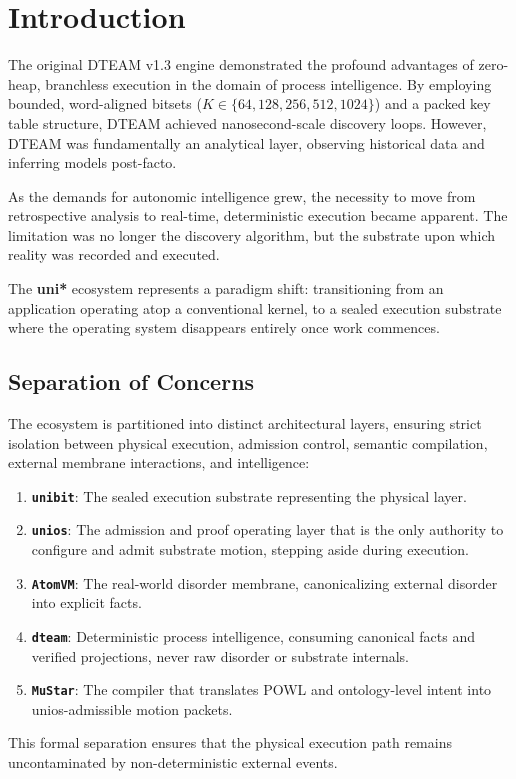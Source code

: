 \chapter{Introduction}

The original DTEAM v1.3 engine demonstrated the profound advantages of zero-heap, branchless execution in the domain of process intelligence. By employing bounded, word-aligned bitsets ($K \in \{64, 128, 256, 512, 1024\}$) and a packed key table structure, DTEAM achieved nanosecond-scale discovery loops. However, DTEAM was fundamentally an analytical layer, observing historical data and inferring models post-facto.

As the demands for autonomic intelligence grew, the necessity to move from retrospective analysis to real-time, deterministic execution became apparent. The limitation was no longer the discovery algorithm, but the substrate upon which reality was recorded and executed. 

The \textbf{uni*} ecosystem represents a paradigm shift: transitioning from an application operating atop a conventional kernel, to a sealed execution substrate where the operating system disappears entirely once work commences.

\section{Separation of Concerns}

The ecosystem is partitioned into distinct architectural layers, ensuring strict isolation between physical execution, admission control, semantic compilation, external membrane interactions, and intelligence:

\begin{enumerate}
    \item \textbf{\texttt{unibit}}: The sealed execution substrate representing the physical layer.
    \item \textbf{\texttt{unios}}: The admission and proof operating layer that is the only authority to configure and admit substrate motion, stepping aside during execution.
    \item \textbf{\texttt{AtomVM}}: The real-world disorder membrane, canonicalizing external disorder into explicit facts.
    \item \textbf{\texttt{dteam}}: Deterministic process intelligence, consuming canonical facts and verified projections, never raw disorder or substrate internals.
    \item \textbf{\texttt{MuStar}}: The compiler that translates POWL and ontology-level intent into unios-admissible motion packets.
\end{enumerate}

This formal separation ensures that the physical execution path remains uncontaminated by non-deterministic external events.
